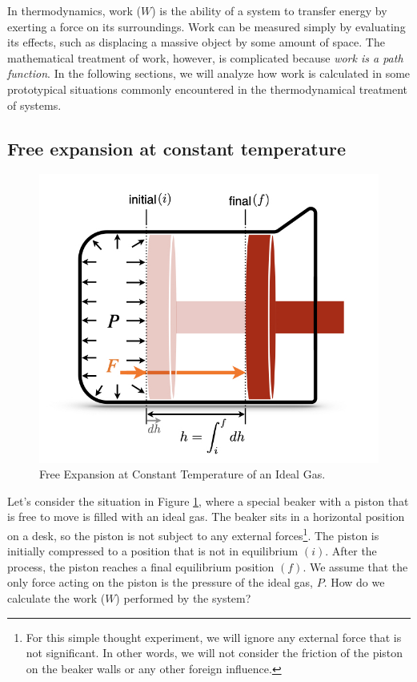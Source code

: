 \documentclass[
  9pt,
]{extbook}
\theoremstyle{definition}
\theoremstyle{definition}
\theoremstyle{definition}
\theoremstyle{remark}
\begin{document}
In thermodynamics, work (\(W\)) is the ability of a system to transfer energy by exerting a force on its surroundings. Work can be measured simply by evaluating its effects, such as displacing a massive object by some amount of space. The mathematical treatment of work, however, is complicated because \emph{work is a path function}. In the following sections, we will analyze how work is calculated in some prototypical situations commonly encountered in the thermodynamical treatment of systems.

\hypertarget{free-expansion-at-constant-temperature}{%
\subsection{Free expansion at constant temperature}\label{free-expansion-at-constant-temperature}}

\begin{figure}

{\centering \includegraphics[width=0.5\linewidth]{./img/OEP_Figures.003} 

}

\caption{Free Expansion at Constant Temperature of an Ideal Gas.}\label{fig:Fig1c3}
\end{figure}

Let's consider the situation in Figure \ref{fig:Fig1c3}, where a special beaker with a piston that is free to move is filled with an ideal gas. The beaker sits in a horizontal position on a desk, so the piston is not subject to any external forces\footnote{For this simple thought experiment, we will ignore any external force that is not significant. In other words, we will not consider the friction of the piston on the beaker walls or any other foreign influence.}. The piston is initially compressed to a position that is not in equilibrium \((i)\). After the process, the piston reaches a final equilibrium position \((f)\). We assume that the only force acting on the piston is the pressure of the ideal gas, \(P\). How do we calculate the work (\(W\)) performed by the system?
\end{document}

